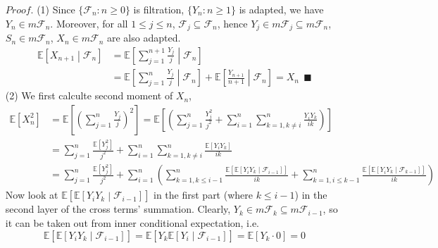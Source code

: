 \documentclass[a4paper,12pt,twoside]{book}
\begin{document}
\begin{itemize}
\begin{itemize}
	\item[$Proof.$] (1) Since $\{\mathcal{F}_n: n\geq 0\}$ is filtration, $\{Y_n: n\geq 1\}$ is adapted, we have $Y_n\in m \mathcal{F}_n$. Moreover, for all $1\leq j\leq n$, $\mathcal{F}_j \subseteq \mathcal{F}_n$, hence $Y_j \in m \mathcal{F}_j \subseteq m \mathcal{F}_n$, $S_n \in m \mathcal{F}_n$, $X_n \in m \mathcal{F}_n$ are also adapted.
	\begin{equation}
		\begin{split}
			\mathbb{E}\left[X_{n+1}\middle|\mathcal{F}_n\right]&=\mathbb{E}\left[\sum_{j=1}^{n+1}\frac{Y_j}{j}\middle|\mathcal{F}_n\right]\\
			&=\mathbb{E}\left[\sum_{j=1}^n \frac{Y_j}{j}\middle|\mathcal{F}_n\right]+\mathbb{E}\left[\frac{Y_{n+1}}{n+1}\middle|\mathcal{F}_n\right]=X_n~~\blacksquare
		\end{split}
	\end{equation}
	(2) We first calculte second moment of $X_n$,
	\begin{equation}
		\begin{split}
			\mathbb{E}\left[X_n^2\right]&=\mathbb{E}\left[\left(\sum_{j=1}^n\frac{Y_j}{j}\right)^2\right]=\mathbb{E}\left[\left(\sum_{j=1}^n\frac{Y_j^2}{j^2}+\sum_{i=1}^n\sum_{k=1,k\ne i}^n \frac{Y_iY_k}{ik}\right)\right]\\
			&=\sum_{j=1}^n \frac{\mathbb{E}\left[Y_j^2\right]}{j^2}+\sum_{i=1}^n\sum_{k=1,k\ne i}^n \frac{\mathbb{E}\left[Y_iY_k\right]}{ik}\\
			&=\sum_{j=1}^n \frac{\mathbb{E}\left[Y_j^2\right]}{j^2}+\sum_{i=1}^n\left(\sum_{k=1,k\leq i-1}^n\frac{\mathbb{E}\left[\mathbb{E}\left[Y_iY_k\middle|\mathcal{F}_{i-1}\right]\right]}{ik}+\sum_{k=1,i \leq k-1}^n\frac{\mathbb{E}\left[\mathbb{E}\left[Y_iY_k\middle|\mathcal{F}_{k-1}\right]\right]}{ik}\right)
		\end{split}
	\end{equation}
	Now look at $\mathbb{E}\left[\mathbb{E}\left[Y_iY_k\middle|\mathcal{F}_{i-1}\right]\right]$ in the first part (where $k\leq i-1$) in the second layer of the cross terms' summation. Clearly, $Y_k \in m \mathcal{F}_k \subseteq m \mathcal{F}_{i-1}$, so it can be taken out from inner conditional expectation, i.e.
	\begin{equation}
		\mathbb{E}\left[\mathbb{E}\left[Y_iY_k\middle|\mathcal{F}_{i-1}\right]\right]=\mathbb{E}\left[Y_k\mathbb{E}\left[Y_i\middle|\mathcal{F}_{i-1}\right]\right]=\mathbb{E}\left[Y_k \cdot 0\right]=0
	\end{equation}

\end{itemize}
\end{itemize}
\end{document}
